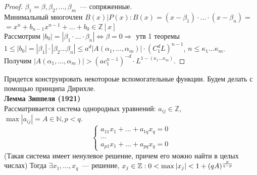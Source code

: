 \begin{proof}
$\beta_1 = \beta, \beta_2, ... , \beta_m$~--- сопряженные.\\
Минимальный многочлен $B(x)|P(x) : B(x) = (x - \beta_1)\cdot ... \cdot (x - \beta_n) =$\\
$ = x^n + b_{n-1}x^{n-1} + ... + b_0 \in\mathbb{Z}[x]$\\
Рассмотрим $|b_0| = |\beta_1\cdot ... \cdot \beta_n| \Leftrightarrow \beta = 0 \Rightarrow$ утв 1 теоремы\\
$1\leqslant |b_0| = |\beta_1|\cdot |\beta_2 ... \beta_n| \leqslant a^d |A(\alpha_1,...,\alpha_m)|\cdot (C_1^dL)^{n-1}$,
$n \leqslant \kappa_1...\kappa_m$.\\
Получим $| A(\alpha_1,...,\alpha_m) | > (ac_1^{n-1})^{-d}\cdot L^{1 - (\kappa_1 ... \kappa_m)}.$
\end{proof}
Придется конструировать некотороые вспомогательные функции. Будем делать с помощью принципа Дирихле.\\
\textbf{Лемма Зиппеля (1921)}\\
Рассматривается система однородных уравнений: $a_{ij}\in\mathbb{Z}$,\\$\max|a_{ij}| = A\in\mathbb{N}, p < q$.\\
$$
\begin{cases}
a_{11}x_1 + ... + a_{1q}x_q = 0 \\
\dots \\
a_{p1}x_1 + ... + a_{pq}x_q = 0
\end{cases}
$$
(Такая система имеет ненулевое решение, причем его можно найти в целых числах)
Тогда $\exists x_1,...,x_q $~— решение, $x_j \in \mathbb{Z}:\\ 0 < \max|x_j| < 1 + (qA)^{\frac{p}{q-p}}$
